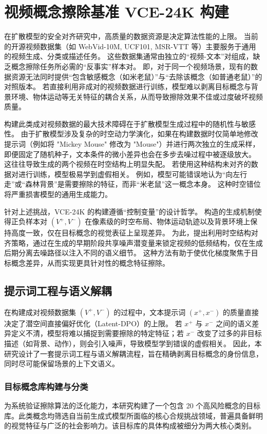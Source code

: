 \section{视频概念擦除基准 VCE-24K 构建}

在扩散模型的安全对齐研究中，高质量的数据资源是决定算法性能的上限。
当前的开源视频数据集（如 WebVid-10M, UCF101, MSR-VTT 等）主要服务于通用的视频生成、分类或描述任务。
这些数据集通常由独立的“视频-文本”对组成，缺乏概念擦除任务所必需的“反事实”样本对。
即，对于同一个视频场景，现有的数据资源无法同时提供“包含敏感概念（如米老鼠）”与“去除该概念（如普通老鼠）”的对照版本。
若直接利用非成对的视频数据进行训练，模型难以剥离目标概念与背景环境、物体运动等无关特征的耦合关系，从而导致擦除效果不佳或过度破坏视频质量。

构建此类成对视频数据的最大技术障碍在于扩散模型生成过程中的随机性与敏感性。
由于扩散模型涉及复杂的时空动力学演化，如果在构建数据时仅简单地修改提示词（例如将 "Mickey Mouse" 修改为 "Mouse"）并进行两次独立的生成采样，即便固定了随机种子，文本条件的微小差异也会在多步去噪过程中被逐级放大。
这往往导致生成的两个视频在时空结构上明显失配。
若使用这种结构未对齐的数据对进行训练，模型极易学到虚假相关。
例如，模型可能错误地认为“向左行走”或“森林背景”是需要擦除的特征，而非“米老鼠”这一概念本身。
这种时空错位将严重损害模型的通用生成能力。

针对上述挑战，VCE-24K 的构建遵循“控制变量”的设计哲学。
构造的生成机制使得正负样本对 $(V^+, V^-)$ 在像素级的时空布局、物体运动轨迹以及背景环境上保持高度一致，仅在目标概念的视觉表征上呈现差异。
为此，提出利用时空结构对齐策略，通过在生成的早期阶段共享噪声潜变量来锁定视频的低频结构，仅在生成后期分离去噪路径以注入不同的语义细节。
这种方法有助于使优化梯度聚焦于目标概念差异，从而实现更具针对性的概念特征擦除。

\subsection{提示词工程与语义解耦}

在构建成对视频数据集 $(V^+, V^-)$ 的过程中，文本提示词 $(x^+, x^-)$ 的质量直接决定了潜空间直接偏好优化（Latent-DPO）的上限。
若 $x^+$ 与 $x^-$ 之间的语义差异定义不清，模型将难以捕捉到需要擦除的特定特征；若 $x^-$ 改变了过多的非目标描述（如背景、动作），则会引入噪声，导致模型学到错误的虚假相关。
因此，本研究设计了一套提示词工程与语义解耦流程，旨在精确剥离目标概念的身份信息，同时尽可能保留场景的上下文语义。

\subsubsection{目标概念库构建与分类}
为系统验证擦除算法的泛化能力，本研究构建了一个包含 20 个高风险概念的目标库。此类概念均筛选自当前生成式模型所面临的核心合规挑战领域，普遍具备鲜明的视觉特征与广泛的社会影响力。该目标库的具体构成被细分为两大核心类别。


